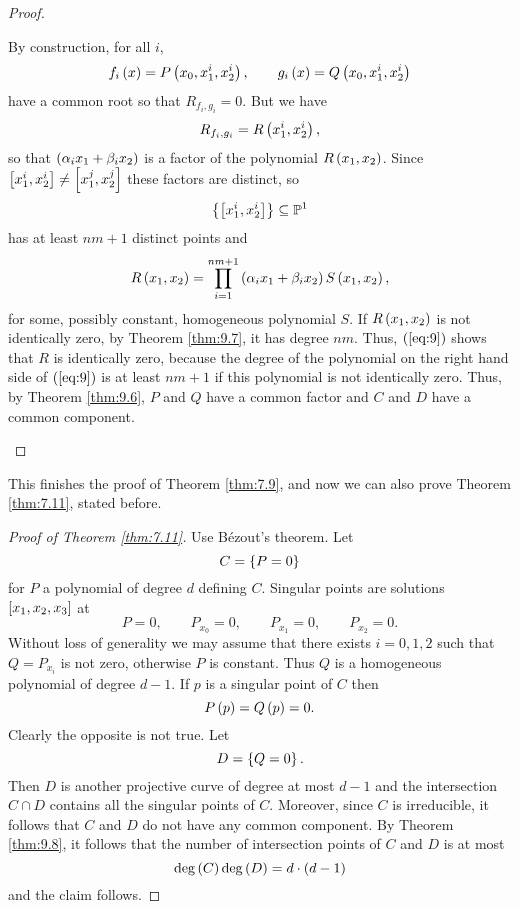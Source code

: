 \begin{proof}
\begin{enumerate}
By construction, for all $ i $,
$$ f_i\rb{x} = P\rb{x_0, x_1^i, x_2^i}, \qquad g_i\rb{x} = Q\rb{x_0, x_1^i, x_2^i} $$
have a common root so that $ R_{f_i, g_i} = 0 $. But we have
$$ R_{f_i, g_i} = R\rb{x_1^i, x_2^i}, $$
so that $ \rb{\alpha_ix_1 + \beta_ix_2} $ is a factor of the polynomial $ R\rb{x_1, x_2} $. Since $ \sb{x_1^i, x_2^i} \ne \sb{x_1^j, x_2^j} $ these factors are distinct, so
$$ \cb{\sb{x_1^i, x_2^i}} \subseteq \P^1 $$
has at least $ nm + 1 $ distinct points and
\begin{equation}
\label{eq:9}
R\rb{x_1, x_2} = \prod_{i = 1}^{nm + 1} \rb{\alpha_ix_1 + \beta_ix_2}S\rb{x_1, x_2},
\end{equation}
for some, possibly constant, homogeneous polynomial $ S $. If $ R\rb{x_1, x_2} $ is not identically zero, by Theorem \ref{thm:9.7}, it has degree $ nm $. Thus, $ \rb{\ref{eq:9}} $ shows that $ R $ is identically zero, because the degree of the polynomial on the right hand side of $ \rb{\ref{eq:9}} $ is at least $ nm + 1 $ if this polynomial is not identically zero. Thus, by Theorem \ref{thm:9.6}, $ P $ and $ Q $ have a common factor and $ C $ and $ D $ have a common component.
\end{enumerate}
\end{proof}

This finishes the proof of Theorem \ref{thm:7.9}, and now we can also prove Theorem \ref{thm:7.11}, stated before.

\begin{proof}[Proof of Theorem \ref{thm:7.11}]
Use B\'ezout's theorem. Let
$$ C = \cb{P = 0} $$
for $ P $ a polynomial of degree $ d $ defining $ C $. Singular points are solutions $ \sb{x_1, x_2, x_3} $ at
$$ P = 0, \qquad P_{x_0} = 0, \qquad P_{x_1} = 0, \qquad P_{x_2} = 0. $$
Without loss of generality we may assume that there exists $ i = 0, 1, 2 $ such that $ Q = P_{x_i} $ is not zero, otherwise $ P $ is constant. Thus $ Q $ is a homogeneous polynomial of degree $ d - 1 $. If $ p $ is a singular point of $ C $ then
$$ P\rb{p} = Q\rb{p} = 0. $$
Clearly the opposite is not true. Let
$$ D = \cb{Q = 0}. $$
Then $ D $ is another projective curve of degree at most $ d - 1 $ and the intersection $ C \cap D $ contains all the singular points of $ C $. Moreover, since $ C $ is irreducible, it follows that $ C $ and $ D $ do not have any common component. By Theorem \ref{thm:9.8}, it follows that the number of intersection points of $ C $ and $ D $ is at most
$$ \deg\rb{C}\deg\rb{D} = d \cdot \rb{d - 1} $$
and the claim follows.
\end{proof}

